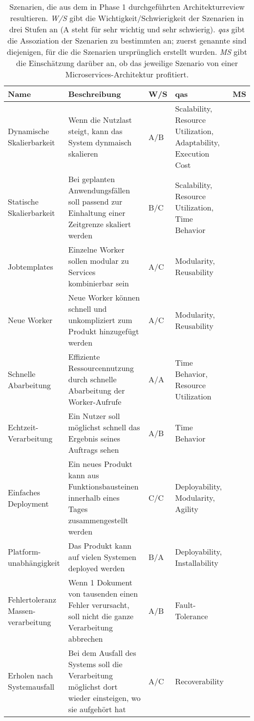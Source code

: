 \begin{table}
	\centering
	\begin{tabular}{ p{} p{6cm} p{0.7cm} p{} l }
		\toprule
		\textbf{Name} & \textbf{Beschreibung} & \textbf{W/S} & \textbf{\glspl{qa}} & \textbf{MS} \\
		\midrule
		Dynamische Skalierbarkeit & Wenn die Nutzlast steigt, kann das System dynmaisch skalieren & A/B & Scalability, Resource Utilization, Adaptability, Execution Cost & \advantage \\
		Statische Skalierbarkeit & Bei geplanten Anwendungsfällen soll passend zur Einhaltung einer Zeitgrenze skaliert werden & B/C & Scalability, Resource Utilization, Time Behavior & \advantage \\
		 Jobtemplates& Einzelne Worker sollen modular zu Services kombinierbar sein & A/C & Modularity, Reusability & \\
		 Neue Worker& Neue Worker können schnell und unkompliziert zum Produkt hinzugefügt werden & A/C & Modularity, Reusability & \advantage  \\
		 Schnelle Abarbeitung & Effiziente Ressourcennutzung durch schnelle Abarbeitung der Worker-Aufrufe  & A/A & Time Behavior, Resource Utilization & \disadvantage \\
		 \glqq Echtzeit\grqq{}-Verarbeitung & Ein Nutzer soll möglichst schnell das Ergebnis seines Auftrags sehen & A/B & Time Behavior & \disadvantage \\
		 Einfaches Deployment & Ein neues Produkt kann aus Funktionsbausteinen innerhalb eines Tages zusammengestellt werden &C/C & Deployability, Modularity, Agility & \disadvantage \\
		 Platform-unabhängigkeit& Das Produkt kann auf vielen Systemen deployed werden & B/A & Deployability, Installability & \advantage \\
		 Fehlertoleranz Massen-verarbeitung & Wenn 1 Dokument von tausenden einen Fehler verursacht, soll nicht die ganze Verarbeitung abbrechen & A/B & Fault-Tolerance &\advantage \\
		 Erholen nach Systemausfall & Bei dem Ausfall des Systems soll die Verarbeitung möglichst dort wieder einsteigen, wo sie aufgehört hat & A/C & Recoverability & \\
		\bottomrule
	\end{tabular}
	\caption[Im Architekturreview ermittelte Qualitätsanforderungen und Szenarien]{
		Szenarien, die aus dem in Phase 1 durchgeführten Architekturreview resultieren.
		\emph{W/S} gibt die Wichtigkeit/Schwierigkeit der Szenarien in drei Stufen an (A steht für sehr wichtig und sehr schwierig).
		\emph{\glspl{qa}} gibt die Assoziation der Szenarien zu bestimmten  an; zuerst genannte sind diejenigen, für die die Szenarien ursprünglich erstellt wurden.
		\emph{MS} gibt die Einschätzung darüber an, ob das jeweilige Szenario von einer Microservices-Architektur profitiert.
		}
	\label{tab:scenarios}
\end{table}

